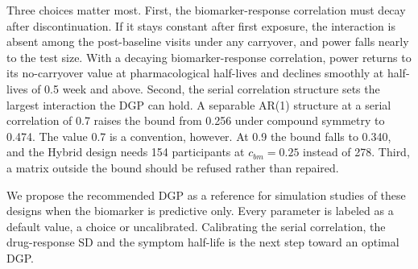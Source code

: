 \documentclass[
  11pt,
]{article}
\begin{document}
Three choices matter most. First, the biomarker-response correlation
must decay after discontinuation. If it stays constant after first
exposure, the interaction is absent among the post-baseline visits
under any carryover, and power falls nearly to the test size. With a
decaying biomarker-response correlation, power returns to its no-carryover value at
pharmacological half-lives and declines smoothly at half-lives of 0.5
week and above. Second, the serial correlation structure sets the
largest interaction the DGP can hold. A separable AR(1) structure at a
serial correlation of 0.7 raises the bound from 0.256 under compound
symmetry to 0.474. The value 0.7 is a convention, however. At 0.9 the
bound falls to 0.340, and the Hybrid design needs
154 participants at \(c_{bm} = 0.25\)
instead of 278. Third, a matrix outside
the bound should be refused rather than repaired.

We propose the recommended DGP as a reference for
simulation studies of these designs when the biomarker is predictive
only. Every parameter is labeled as a
default value, a choice or uncalibrated. Calibrating the serial
correlation, the drug-response SD and the symptom half-life is the
next step toward an optimal DGP.
\end{document}
